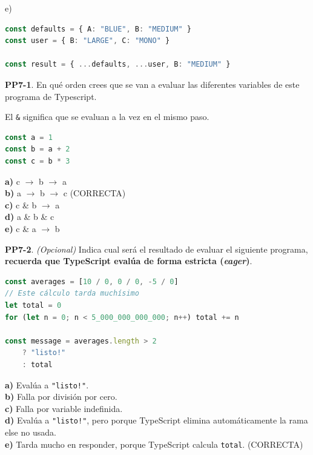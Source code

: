 \begin{opcion}{e)}
\begin{lstlisting}[language=TypeScript]
const defaults = { A: "BLUE", B: "MEDIUM" }
const user = { B: "LARGE", C: "MONO" }

const result = { ...defaults, ...user, B: "MEDIUM" }
\end{lstlisting}
\end{opcion}

\textbf{PP7-1}. En qué orden crees que se van a evaluar las diferentes variables de este programa de Typescript.

El \texttt{\&} significa que se evaluan a la vez en el mismo paso.

\begin{bloquecodigo}
\begin{lstlisting}[language=TypeScript]
const a = 1
const b = a + 2
const c = b * 3
\end{lstlisting}
\end{bloquecodigo}

\textbf{a)} c $\rightarrow$ b $\rightarrow$ a\\
\textbf{b)} a $\rightarrow$ b $\rightarrow$ c (CORRECTA)\\
\textbf{c)} c \& b $\rightarrow$ a\\
\textbf{d)} a \& b \& c\\
\textbf{e)} c \& a $\rightarrow$ b

\textbf{PP7-2}. \emph{(Opcional)} Indica cual será el resultado de evaluar el siguiente programa, \textbf{recuerda que TypeScript evalúa de forma estricta (\emph{eager})}.

\begin{bloquecodigo}
\begin{lstlisting}[language=TypeScript]
const averages = [10 / 0, 0 / 0, -5 / 0]
// Este cálculo tarda muchísimo
let total = 0
for (let n = 0; n < 5_000_000_000_000; n++) total += n

const message = averages.length > 2
    ? "listo!"
    : total
\end{lstlisting}
\end{bloquecodigo}

\textbf{a)} Evalúa a \texttt{"listo!"}.\\
\textbf{b)} Falla por división por cero.\\
\textbf{c)} Falla por variable indefinida.\\
\textbf{d)} Evalúa a \texttt{"listo!"}, pero porque TypeScript elimina automáticamente la rama else no usada.\\
\textbf{e)} Tarda mucho en responder, porque TypeScript calcula \texttt{total}. (CORRECTA)

